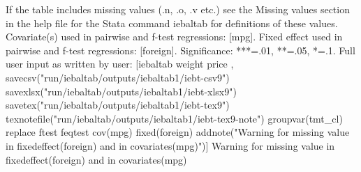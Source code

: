 If the table includes missing values (.n, .o, .v etc.) see the Missing values section in the help file for the Stata command iebaltab for definitions of these values. Covariate(s) used in pairwise and f-test regressions: [mpg]. Fixed effect used in pairwise and f-test regressions: [foreign]. Significance: ***=.01, **=.05, *=.1. Full user input as written by user: [iebaltab weight price , savecsv("run/iebaltab/outputs/iebaltab1/iebt-csv9") savexlsx("run/iebaltab/outputs/iebaltab1/iebt-xlsx9") savetex("run/iebaltab/outputs/iebaltab1/iebt-tex9") texnotefile("run/iebaltab/outputs/iebaltab1/iebt-tex9-note") groupvar(tmt\_cl) replace ftest feqtest cov(mpg) fixed(foreign) addnote("Warning for missing value in fixedeffect(foreign) and in covariates(mpg)")] Warning for missing value in fixedeffect(foreign) and in covariates(mpg)
